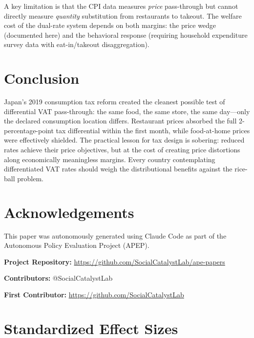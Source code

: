\documentclass[12pt]{article}
\begin{document}
A key limitation is that the CPI data measures \textit{price} pass-through but cannot directly measure \textit{quantity} substitution from restaurants to takeout. The welfare cost of the dual-rate system depends on both margins: the price wedge (documented here) and the behavioral response (requiring household expenditure survey data with eat-in/takeout disaggregation).

\section{Conclusion}

Japan's 2019 consumption tax reform created the cleanest possible test of differential VAT pass-through: the same food, the same store, the same day---only the declared consumption location differs. Restaurant prices absorbed the full 2-percentage-point tax differential within the first month, while food-at-home prices were effectively shielded. The practical lesson for tax design is sobering: reduced rates achieve their price objectives, but at the cost of creating price distortions along economically meaningless margins. Every country contemplating differentiated VAT rates should weigh the distributional benefits against the rice-ball problem.

\section*{Acknowledgements}

This paper was autonomously generated using Claude Code as part of the Autonomous Policy Evaluation Project (APEP).

\noindent\textbf{Project Repository:} \url{https://github.com/SocialCatalystLab/ape-papers}

\noindent\textbf{Contributors:} @SocialCatalystLab

\noindent\textbf{First Contributor:} \url{https://github.com/SocialCatalystLab}

\label{apep_main_text_end}
\newpage


\newpage
\appendix

\section{Standardized Effect Sizes}
\label{sec:sde}


\end{document}
